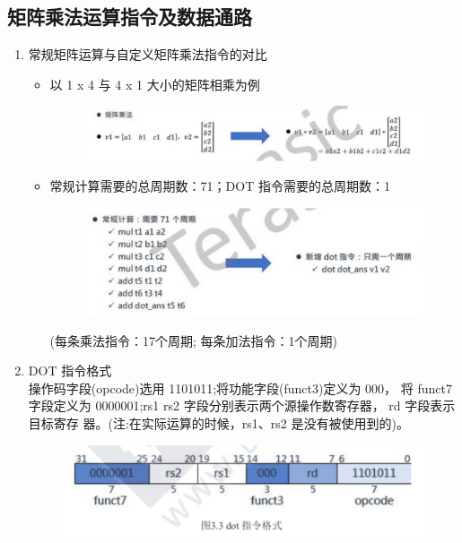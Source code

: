 \documentclass[a4paper, 14pt, oneside]{book} %
\numberwithin{equation}{subsection}
\begin{document}
		\subsection{矩阵乘法运算指令及数据通路}
		\begin{enumerate}
			\item 常规矩阵运算与自定义矩阵乘法指令的对比
				\begin{itemize}
					\item{以 1 x 4 与 4 x 1 大小的矩阵相乘为例}
						\begin{figure}[!htbp]
							\centering
							\includegraphics[scale=0.5]{img/dot1.png}
						\end{figure}
					\item{常规计算需要的总周期数：71；DOT 指令需要的总周期数：1\\}
						\begin{figure}[!htbp]
							\centering
							\includegraphics[scale=0.5]{img/dot2.png}
						\end{figure}
						(每条乘法指令：17个周期; 每条加法指令：1个周期)
				\end{itemize}

			\item DOT 指令格式\\
			操作码字段(opcode)选用 1101011;将功能字段(funct3)定义为 000，
			将 funct7 字段定义为 0000001;rs1 rs2 字段分别表示两个源操作数寄存器，
			rd 字段表示目标寄存 器。(注:在实际运算的时候，rs1、rs2 是没有被使用到的)。
				\begin{figure}[!htbp]
					\centering
					\includegraphics[scale=0.5]{img/dot3.png}
				\end{figure}
			

\end{enumerate}
\end{document}
